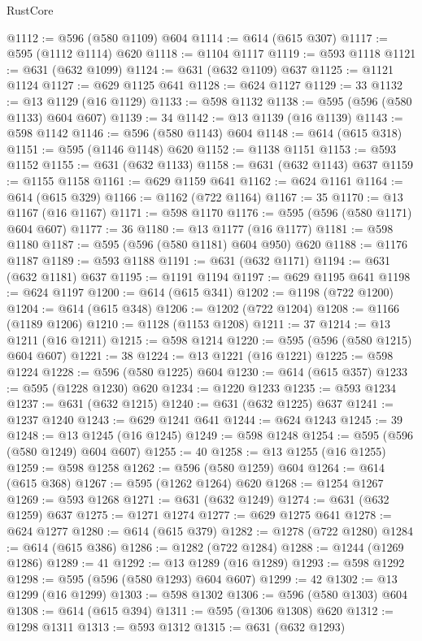 \begin{lexlean}{RustCore}
\begin{coremodule}
@1112 := @596 (@580 @1109) @604
@1114 := @614 (@615 @307)
@1117 := @595 (@1112 @1114) @620
@1118 := @1104 @1117
@1119 := @593 @1118
@1121 := @631 (@632 @1099)
@1124 := @631 (@632 @1109) @637
@1125 := @1121 @1124
@1127 := @629 @1125 @641
@1128 := @624 @1127
@1129 := 33
@1132 := @13 @1129 (@16 @1129)
@1133 := @598 @1132
@1138 := @595 (@596 (@580 @1133) @604 @607)
@1139 := 34
@1142 := @13 @1139 (@16 @1139)
@1143 := @598 @1142
@1146 := @596 (@580 @1143) @604
@1148 := @614 (@615 @318)
@1151 := @595 (@1146 @1148) @620
@1152 := @1138 @1151
@1153 := @593 @1152
@1155 := @631 (@632 @1133)
@1158 := @631 (@632 @1143) @637
@1159 := @1155 @1158
@1161 := @629 @1159 @641
@1162 := @624 @1161
@1164 := @614 (@615 @329)
@1166 := @1162 (@722 @1164)
@1167 := 35
@1170 := @13 @1167 (@16 @1167)
@1171 := @598 @1170
@1176 := @595 (@596 (@580 @1171) @604 @607)
@1177 := 36
@1180 := @13 @1177 (@16 @1177)
@1181 := @598 @1180
@1187 := @595 (@596 (@580 @1181) @604 @950) @620
@1188 := @1176 @1187
@1189 := @593 @1188
@1191 := @631 (@632 @1171)
@1194 := @631 (@632 @1181) @637
@1195 := @1191 @1194
@1197 := @629 @1195 @641
@1198 := @624 @1197
@1200 := @614 (@615 @341)
@1202 := @1198 (@722 @1200)
@1204 := @614 (@615 @348)
@1206 := @1202 (@722 @1204)
@1208 := @1166 (@1189 @1206)
@1210 := @1128 (@1153 @1208)
@1211 := 37
@1214 := @13 @1211 (@16 @1211)
@1215 := @598 @1214
@1220 := @595 (@596 (@580 @1215) @604 @607)
@1221 := 38
@1224 := @13 @1221 (@16 @1221)
@1225 := @598 @1224
@1228 := @596 (@580 @1225) @604
@1230 := @614 (@615 @357)
@1233 := @595 (@1228 @1230) @620
@1234 := @1220 @1233
@1235 := @593 @1234
@1237 := @631 (@632 @1215)
@1240 := @631 (@632 @1225) @637
@1241 := @1237 @1240
@1243 := @629 @1241 @641
@1244 := @624 @1243
@1245 := 39
@1248 := @13 @1245 (@16 @1245)
@1249 := @598 @1248
@1254 := @595 (@596 (@580 @1249) @604 @607)
@1255 := 40
@1258 := @13 @1255 (@16 @1255)
@1259 := @598 @1258
@1262 := @596 (@580 @1259) @604
@1264 := @614 (@615 @368)
@1267 := @595 (@1262 @1264) @620
@1268 := @1254 @1267
@1269 := @593 @1268
@1271 := @631 (@632 @1249)
@1274 := @631 (@632 @1259) @637
@1275 := @1271 @1274
@1277 := @629 @1275 @641
@1278 := @624 @1277
@1280 := @614 (@615 @379)
@1282 := @1278 (@722 @1280)
@1284 := @614 (@615 @386)
@1286 := @1282 (@722 @1284)
@1288 := @1244 (@1269 @1286)
@1289 := 41
@1292 := @13 @1289 (@16 @1289)
@1293 := @598 @1292
@1298 := @595 (@596 (@580 @1293) @604 @607)
@1299 := 42
@1302 := @13 @1299 (@16 @1299)
@1303 := @598 @1302
@1306 := @596 (@580 @1303) @604
@1308 := @614 (@615 @394)
@1311 := @595 (@1306 @1308) @620
@1312 := @1298 @1311
@1313 := @593 @1312
@1315 := @631 (@632 @1293)

\end{coremodule}
\end{lexlean}
